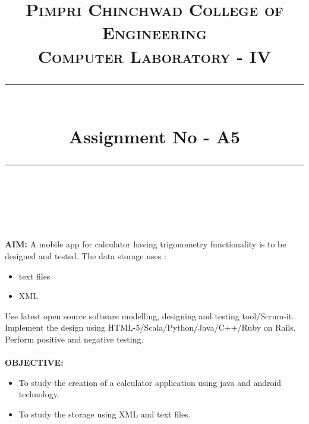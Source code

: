 \documentclass[a4paper,12pt]{article}
\title{
	\normalfont \normalsize 
	\textsc{Pimpri Chinchwad College of Engineering \\ 
		Computer Laboratory - IV} \\
	[10pt]   
	\rule{\linewidth}{0.5pt} \\[6pt] 
	\huge Assignment No - A5 \\
	\rule{\linewidth}{2pt}  \\[10pt]
}
\author{}
\date{\normalsize}
\begin{document}
	\maketitle

\textbf{AIM: } A mobile app for calculator having trigonometry functionality is to be designed and tested. The data storage uses :
\begin{itemize}
\item text files
\item XML
\end{itemize}
Use latest open source software modelling, designing and testing tool/Scrum-it. Implement the design using HTML-5/Scala/Python/Java/C++/Ruby on Rails. Perform positive and negative testing.\\ \\


\noindent \textbf{OBJECTIVE:}
\begin{itemize}
\item To study the creation of a calculator application using java and android technology.
\item To study the storage using XML and text files. 
\end{itemize}

\newpage
\end{document}
